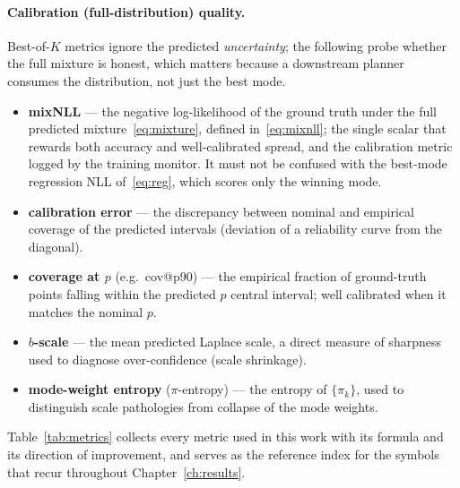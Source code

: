 \paragraph{Calibration (full-distribution) quality.}
Best-of-$K$ metrics ignore the predicted \emph{uncertainty}; the following probe
whether the full mixture is honest, which matters because a downstream planner
consumes the distribution, not just the best mode.
\begin{itemize}[leftmargin=1.4em]
  \item \textbf{mixNLL} --- the negative log-likelihood of the ground truth under
        the full predicted mixture~\eqref{eq:mixture}, defined in~\eqref{eq:mixnll};
        the single scalar that rewards both accuracy and well-calibrated spread, and
        the calibration metric logged by the training monitor. It must not be
        confused with the best-mode regression NLL of~\eqref{eq:reg}, which scores
        only the winning mode.
  \item \textbf{calibration error} --- the discrepancy between nominal and empirical
        coverage of the predicted intervals (deviation of a reliability curve from
        the diagonal).
  \item \textbf{coverage at $p$} (e.g.\ cov@p90) --- the empirical fraction of
        ground-truth points falling within the predicted $p$ central interval;
        well calibrated when it matches the nominal $p$.
  \item \textbf{$b$-scale} --- the mean predicted Laplace scale, a direct measure of
        sharpness used to diagnose over-confidence (scale shrinkage).
  \item \textbf{mode-weight entropy} ($\pi$-entropy) --- the entropy of
        $\{\pi_k\}$, used to distinguish scale pathologies from collapse of the
        mode weights.
\end{itemize}

Table~\ref{tab:metrics} collects every metric used in this work with its formula and
its direction of improvement, and serves as the reference index for the symbols that
recur throughout Chapter~\ref{ch:results}.

